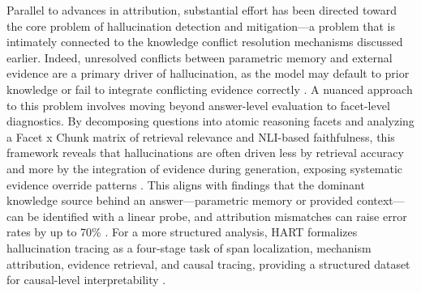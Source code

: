 \documentclass[11pt]{article}
\begin{document}
Parallel to advances in attribution, substantial effort has been directed toward the core problem of hallucination detection and mitigation---a problem that is intimately connected to the knowledge conflict resolution mechanisms discussed earlier. Indeed, unresolved conflicts between parametric memory and external evidence are a primary driver of hallucination, as the model may default to prior knowledge or fail to integrate conflicting evidence correctly \cite{ref178}. A nuanced approach to this problem involves moving beyond answer-level evaluation to facet-level diagnostics. By decomposing questions into atomic reasoning facets and analyzing a Facet x Chunk matrix of retrieval relevance and NLI-based faithfulness, this framework reveals that hallucinations are often driven less by retrieval accuracy and more by the integration of evidence during generation, exposing systematic evidence override patterns \cite{ref178}. This aligns with findings that the dominant knowledge source behind an answer---parametric memory or provided context---can be identified with a linear probe, and attribution mismatches can raise error rates by up to 70\% \cite{ref201}. For a more structured analysis, HART formalizes hallucination tracing as a four-stage task of span localization, mechanism attribution, evidence retrieval, and causal tracing, providing a structured dataset for causal-level interpretability \cite{ref202}.
\end{document}
